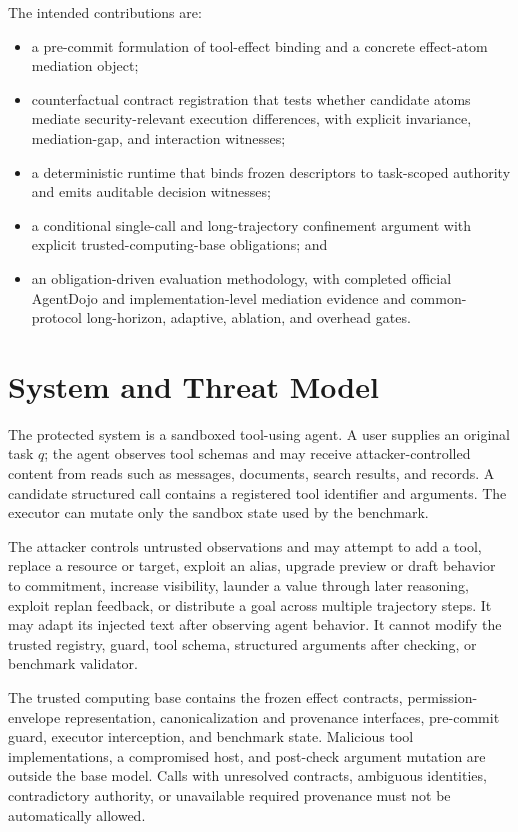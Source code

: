 \documentclass[letterpaper,twocolumn,10pt]{article}
\begin{document}
The intended contributions are:
\begin{itemize}[leftmargin=*]
  \item a pre-commit formulation of tool-effect binding and a concrete effect-atom mediation object;
  \item counterfactual contract registration that tests whether candidate atoms mediate security-relevant execution differences, with explicit invariance, mediation-gap, and interaction witnesses;
  \item a deterministic runtime that binds frozen descriptors to task-scoped authority and emits auditable decision witnesses;
  \item a conditional single-call and long-trajectory confinement argument with explicit trusted-computing-base obligations; and
  \item an obligation-driven evaluation methodology, with completed official AgentDojo and implementation-level mediation evidence and common-protocol long-horizon, adaptive, ablation, and overhead gates.
\end{itemize}
 \section{System and Threat Model}

The protected system is a sandboxed tool-using agent. A user supplies an original task $q$; the agent observes tool schemas and may receive attacker-controlled content from reads such as messages, documents, search results, and records. A candidate structured call contains a registered tool identifier and arguments. The executor can mutate only the sandbox state used by the benchmark.

The attacker controls untrusted observations and may attempt to add a tool, replace a resource or target, exploit an alias, upgrade preview or draft behavior to commitment, increase visibility, launder a value through later reasoning, exploit replan feedback, or distribute a goal across multiple trajectory steps. It may adapt its injected text after observing agent behavior. It cannot modify the trusted registry, guard, tool schema, structured arguments after checking, or benchmark validator.

The trusted computing base contains the frozen effect contracts, permission-envelope representation, canonicalization and provenance interfaces, pre-commit guard, executor interception, and benchmark state. Malicious tool implementations, a compromised host, and post-check argument mutation are outside the base model. Calls with unresolved contracts, ambiguous identities, contradictory authority, or unavailable required provenance must not be automatically allowed.
\end{document}

